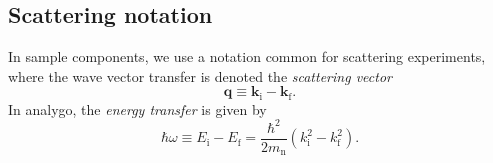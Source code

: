 
\subsection{Scattering notation}
In sample components, we use a notation common for scattering experiments,
where the wave vector transfer is denoted the {\em scattering vector}
\begin{equation} \label{eq:q-transfer}
\boldsymbol{q} \equiv \boldsymbol{k}_\mathrm{i} - \boldsymbol{k}_\mathrm{f} .
\end{equation}
In analygo, the {\em energy transfer} is given by
\begin{equation} \label{eq:w-transfer}
\hbar \omega \equiv E_\mathrm{i} - E_\mathrm{f} =
\frac{\hbar^2}{2 m_\mathrm{n}} \left( k_\mathrm{i}^2 - k_\mathrm{f}^2 \right) .
\end{equation}

